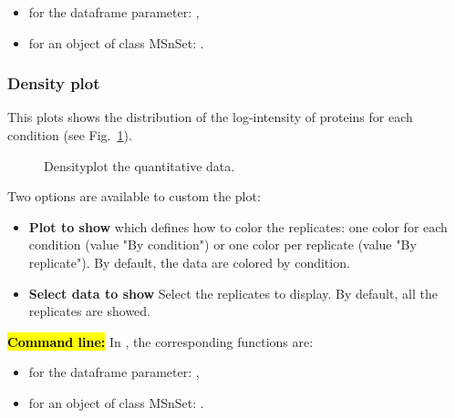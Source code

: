 \documentclass[12pt]{article}
\begin{document}
{\begin{itemize}
\item for the dataframe parameter: ,
\item for an object of class MSnSet: .
\end{itemize}


\subsubsection{Density plot}\label{sec:densityplot}
This plots shows the distribution of the log-intensity of proteins for each 
condition (see Fig.~\ref{fig:sddp}).

\begin {figure}
\centering
{}
\caption{Densityplot the quantitative data.}\label{fig:sddp}
\end {figure}

{Two options are available to custom the plot:
\begin{itemize}
\item \textbf{Plot to show} which defines how to color the replicates: one 
color for each condition (value "By condition") or one color per replicate 
(value "By replicate"). By default, the data are colored by condition.
\item \textbf{Select data to show} Select the replicates to display. By 
default, all the replicates are showed.
\end {itemize}
}


\hl{\bf Command line:} In , the corresponding functions are:
\begin{itemize}
\item for the dataframe parameter: ,
\item for an object of class MSnSet: .
\end{itemize}


}
\end{document}
